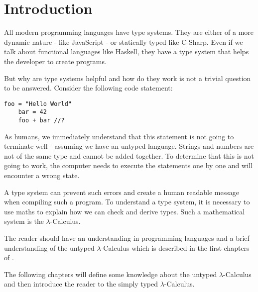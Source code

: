 \section{Introduction}

All modern programming languages have type systems.
They are either of a more dynamic nature - like JavaScript -
or statically typed like C-Sharp. Even if we talk about functional
languages like Haskell, they have a type system that helps
the developer to create programs.

But why are type systems helpful and how do they work
is not a trivial question to be answered. Consider
the following code statement:

\begin{lstlisting}[caption={Untyped language},captionpos=b]
    foo = "Hello World"
    bar = 42
    foo + bar //?
\end{lstlisting}

As humans, we immediately understand that this statement
is not going to terminate well - assuming we have an untyped
language. Strings and numbers are not
of the same type and cannot be added together. To determine
that this is not going to work, the computer needs to execute
the statements one by one and will encounter a wrong state.

A type system can prevent such errors and create a
human readable message when compiling such a program.
To understand a type system, it is necessary to use
maths to explain how we can check and derive types.
Such a mathematical system is the $\lambda$-Calculus.

The reader should have an understanding in programming
languages and a brief understanding of the untyped
$\lambda$-Calculus which is described in the first
chapters of \cite{pierce2002ProgLang}.

The following chapters will define some knowledge about
the untyped $\lambda$-Calculus and then introduce the
reader to the simply typed $\lambda$-Calculus.
